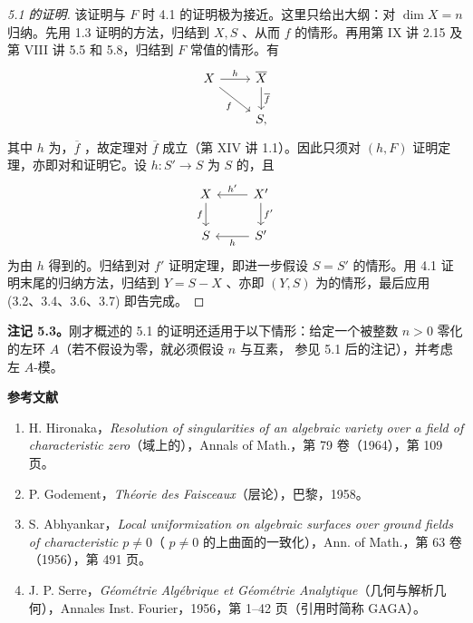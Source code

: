 \begin{proof}[5.1 的证明]
该证明与 $F$ 时 4.1 的证明极为接近。这里只给出大纲：对 $\dim X=n$ 归纳。先用 1.3 证明的方法，归结到 $X,S$ 、从而 $f$ 的情形。再用第 IX 讲 2.15 及第 VIII 讲 5.5 和 5.8，归结到 $F$ 常值的情形。有
\[
\begin{tikzcd}
X\arrow[r,"h"]\arrow[dr,"f"']&\overline X\arrow[d,"\overline f"]\\&S,
\end{tikzcd}
\]
其中 $h$ 为，$\overline f$ ，故定理对 $\overline f$ 成立（第 XIV 讲 1.1）。因此只须对 $(h,F)$ 证明定理，亦即对和证明它。设 $h:S'\to S$ 为 $S$ 的，且
\[
\begin{tikzcd}
X\arrow[d,"f"']&X'\arrow[l,"h'"']\arrow[d,"f'"]\\
S&S'\arrow[l,"h"]
\end{tikzcd}
\]
为由 $h$ 得到的。归结到对 $f'$ 证明定理，即进一步假设 $S=S'$ 的情形。用 4.1 证明末尾的归纳方法，归结到 $Y=S-X$ 、亦即 $(Y,S)$ 为的情形，最后应用 (3.2、3.4、3.6、3.7) 即告完成。
\end{proof}
\textbf{注记 5.3。}刚才概述的 5.1 的证明还适用于以下情形：给定一个被整数 $n>0$ 零化的左环 $A$（若不假设为零，就必须假设 $n$ 与互素，
参见 5.1 后的注记），并考虑左 $A$-模。

\begin{center}\textbf{参考文献}\end{center}
\begin{enumerate}
\item[{[1]}] H. Hironaka，\textit{Resolution of singularities of an algebraic variety over a field of characteristic zero}（域上的），Annals of Math.，第 79 卷（1964），第 109 页。
\item[{[2]}] P. Godement，\textit{Théorie des Faisceaux}（层论），巴黎，1958。
\item[{[3]}] S. Abhyankar，\textit{Local uniformization on algebraic surfaces over ground fields of characteristic $p\ne0$}（ $p\ne0$ 的上曲面的一致化），Ann. of Math.，第 63 卷（1956），第 491 页。
\item[{[4]}] J. P. Serre，\textit{Géométrie Algébrique et Géométrie Analytique}（几何与解析几何），Annales Inst. Fourier，1956，第 1--42 页（引用时简称 GAGA）。
\end{enumerate}
